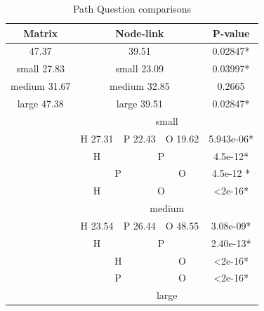 \documentclass{l4proj}
\begin{document}
\begin{table}[H]
\centering
\caption{Path Question comparisons}
\label{pathResults}
\begin{tabular}{|c|c|c|c|c|c|c|}
\hline
\multicolumn{3}{|c|}{\textbf{Matrix}}     & \multicolumn{3}{c|}{\textbf{Node-link}} & \textbf{P-value} \\ \hline
\multicolumn{3}{|c|}{47.37}               & \multicolumn{3}{c|}{39.51}              & 0.02847*         \\ \hline
\multicolumn{3}{|c|}{small 27.83}         & \multicolumn{3}{c|}{small 23.09}        & 0.03997*         \\ \hline
\multicolumn{3}{|c|}{medium 31.67}        & \multicolumn{3}{c|}{medium 32.85}       & 0.2665           \\ \hline
\multicolumn{3}{|c|}{large 47.38}         & \multicolumn{3}{c|}{large 39.51}        & 0.02847*         \\ \hline
\multicolumn{3}{|c|}{\multirow{15}{*}{}}  & \multicolumn{4}{c|}{small}                                 \\ \cline{4-7} 
\multicolumn{3}{|c|}{}                    & H 27.31      & P 22.43     & O 19.62    & 5.943e-06*       \\ \cline{4-7} 
\multicolumn{3}{|c|}{}                    & H            & \multicolumn{2}{c|}{P}   & 4.5e-12*         \\ \cline{4-7} 
\multicolumn{3}{|c|}{}                    & \multicolumn{2}{c|}{P}     & O          & 4.5e-12 *        \\ \cline{4-7} 
\multicolumn{3}{|c|}{}                    & H            & \multicolumn{2}{c|}{O}   & \textless 2e-16* \\ \cline{4-7} 
\multicolumn{3}{|c|}{}                    & \multicolumn{4}{c|}{medium}                                \\ \cline{4-7} 
\multicolumn{3}{|c|}{}                    & H 23.54      & P 26.44     & O 48.55    & 3.08e-09*        \\ \cline{4-7} 
\multicolumn{3}{|c|}{}                    & H            & \multicolumn{2}{c|}{P}   & 2.40e-13*        \\ \cline{4-7} 
\multicolumn{3}{|c|}{}                    & \multicolumn{2}{c|}{H}     & O          & \textless 2e-16* \\ \cline{4-7} 
\multicolumn{3}{|c|}{}                    & \multicolumn{2}{c|}{P}     & O          & \textless 2e-16* \\ \cline{4-7} 
\multicolumn{3}{|c|}{}                    & \multicolumn{4}{c|}{large}                                 \\ \cline{4-7} 

\end{tabular}
\end{table}
\end{document}
